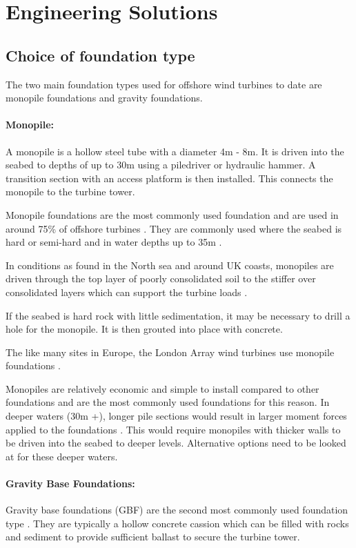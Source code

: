 \documentclass[12pt]{article} %
\begin{document}
\section{Engineering Solutions}

\subsection{Choice of foundation type}

The two main foundation types used for offshore wind turbines to date are monopile foundations and gravity foundations.

\paragraph{Monopile:} A monopile is a hollow steel tube with a diameter 4m - 8m. It is driven into the seabed to depths of up to 30m using a piledriver or hydraulic hammer. A transition section with an access platform is then installed. This connects the monopile to the turbine tower.

Monopile foundations are the most commonly used foundation and are used in around 75\% of offshore turbines \cite{EWEA_deep_water}. They are commonly used where the seabed is hard or semi-hard and in water depths up to 35m \cite{4Coffshore:1}.

In conditions as found in the North sea and around UK coasts, monopiles are driven through the top layer of poorly consolidated soil to the stiffer over consolidated layers which can support the turbine loads \cite{jf368cam.ac.uk_research}.

If the seabed is hard rock with little sedimentation, it may be necessary to drill a hole for the monopile. It is then grouted into place with concrete.

The like many sites in Europe, the London Array wind turbines use monopile foundations \cite{london_array}.

Monopiles are relatively economic and simple to install compared to other foundations and are the most commonly used foundations for this reason.
In deeper waters (30m +), longer pile sections would result in larger moment forces applied to the foundations \cite{doi:10.1680/ener.11.00003}. This would require monopiles with thicker walls to be driven into the seabed to deeper levels.
Alternative options need to be looked at for these deeper waters.


\paragraph{Gravity Base Foundations:} Gravity base foundations (GBF) are the second most commonly used foundation type \cite{EWEA_deep_water}. They are typically a hollow concrete cassion which can be filled with rocks and sediment to provide sufficient ballast to secure the turbine tower.
\end{document}

